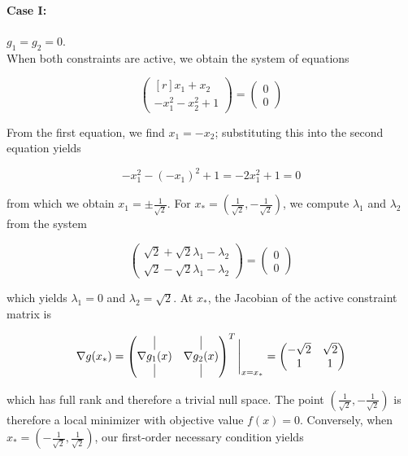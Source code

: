 \begin{solution}
    \paragraph{Case I:} $g_1 = g_2 = 0.$ \ \\
    When both constraints are active, we obtain the system of equations

    $$
    \begin{pmatrix*}[r]
        x_1 + x_2 \\
        -x_1^2 - x_2^2 + 1
    \end{pmatrix*} = \begin{pmatrix*}
        0 \\
        0
    \end{pmatrix*}
    $$

    From the first equation, we find $x_1 = -x_2$; substituting this into the second equation yields

    $$
    -x_1^2 - (-x_1)^2 + 1 = -2 x_1^2 + 1 = 0
    $$

    from which we obtain $x_1 = \pm \frac{1}{\sqrt{2}}$. For 
    $x_* = \left( \frac{1}{\sqrt{2}}, -\frac{1}{\sqrt{2}} \right)$, we compute $\lambda_1$ and $\lambda_2$ from the 
    system

    $$
    \begin{pmatrix*}
        \sqrt{2} + \sqrt{2} \lambda_1 - \lambda_2 \\
        \sqrt{2} - \sqrt{2} \lambda_1 - \lambda_2
    \end{pmatrix*} = \begin{pmatrix*}
        0 \\
        0
    \end{pmatrix*}
    $$

    which yields $\lambda_1 = 0$ and $\lambda_2 = \sqrt{2}$. At $x_*$, the Jacobian of the active constraint matrix is

    $$
    \nabla g(x_*) = \begin{pmatrix*}
        \vline        & \vline \\
        \nabla g_1(x) & \nabla g_2(x) \\
        \vline        & \vline
    \end{pmatrix*}^T \Bigg|_{x = x_*} = \begin{pmatrix*}
        -\sqrt{2} & \sqrt{2} \\
        1         & 1
    \end{pmatrix*}
    $$
   
    which has full rank and therefore a trivial null space. The point 
    $\left( \frac{1}{\sqrt{2}}, -\frac{1}{\sqrt{2}} \right)$ is therefore a local minimizer with objective value 
    $f(x) = 0$. Conversely, when $x_* = \left( -\frac{1}{\sqrt{2}}, \frac{1}{\sqrt{2}} \right)$, our first-order 
    necessary condition yields


\end{solution}

